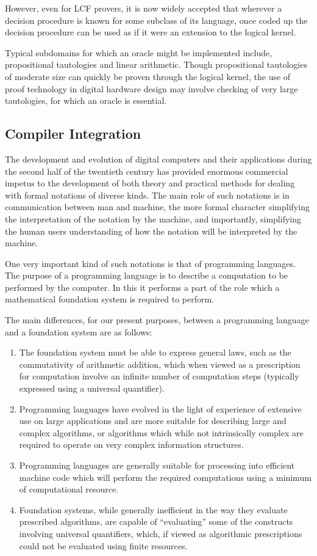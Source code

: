 However, even for LCF provers, it is now widely accepted that wherever a decision procedure is known for some subclass of its language, once coded up the decision procedure can be used as if it were an extension to the logical kernel.

Typical subdomains for which an oracle might be implemented include, propositional tautologies and linear arithmetic.
Though propositional tautologies of moderate size can quickly be proven through the logical kernel, the use of proof technology in digital hardware design may involve checking of very large tautologies, for which an oracle is essential.

\subsection{Compiler Integration}

The development and evolution of digital computers and their applications during the second half of the twentieth century has provided enormous commercial impetus to the development of both theory and practical methods for dealing with formal notations of diverse kinds.
The main role of such notations is in communication between man and machine, the more formal character simplifying the interpretation of the notation by the machine, and importantly, simplifying the human users understanding of how the notation will be interpreted by the machine.

One very important kind of such notations is that of programming languages.
The purpose of a programming language is to describe a computation to be performed by the computer.
In this it performs a part of the role which a mathematical foundation system is required to perform.

The main differences, for our present purposes, between a programming language and a foundation system are as follows:

\begin{enumerate}
\item The foundation system must be able to express general laws, such as the commutativity of arithmetic addition, which when viewed as a prescription for computation involve an infinite number of computation steps (typically expressed using a universal quantifier).
\item Programming languages have evolved in the light of experience of extensive use on large applications and are more suitable for describing large and complex algorithms, or algorithms which while not intrinsically complex are required to operate on very complex information structures.
\item Programming languages are generally suitable for processing into efficient machine code which will perform the required computations using a minimum of computational resource.
\item Foundation systems, while generally inefficient in the way they evaluate prescribed algorithms, are capable of ``evaluating'' some of the constructs involving universal quantifiers, which, if viewed as algorithmic prescriptions could not be evaluated using finite resources.
\end{enumerate}

